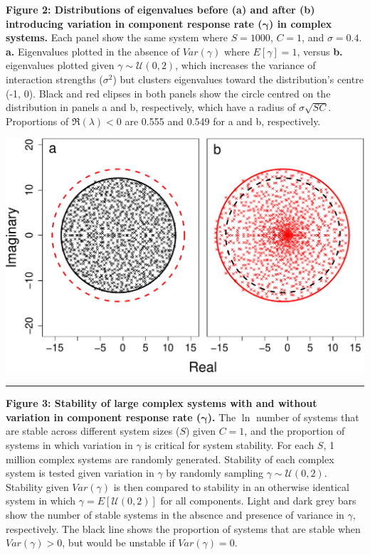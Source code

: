 \documentclass[]{article}
\begin{document}
\textbf{Figure 2: Distributions of eigenvalues before (a) and after (b)
introducing variation in component response rate
(\(\boldsymbol{\gamma}\)) in complex systems.} Each panel show the same
system where \(S = 1000\), \(C = 1\), and \(\sigma = 0.4\). \textbf{a.}
Eigenvalues plotted in the absence of \(Var(\gamma)\) where
\(E[\gamma] = 1\), versus \textbf{b.} eigenvalues plotted given
\(\gamma \sim \mathcal{U}(0, 2)\), which increases the variance of
interaction strengths (\(\sigma^{2}\)) but clusters eigenvalues toward
the distribution's centre (-1, 0). Black and red elipses in both panels
show the circle centred on the distribution in panels a and b,
respectively, which have a radius of \(\sigma \sqrt{SC}\). Proportions
of \(\Re(\lambda) < 0\) are 0.555 and 0.549 for a and b, respectively.

\includegraphics{ms_files/figure-latex/unnamed-chunk-8-1.pdf}

\begin{center}\rule{0.5\linewidth}{\linethickness}\end{center}

\textbf{Figure 3: Stability of large complex systems with and without
variation in component response rate (\(\boldsymbol{\gamma}\)).} The
\(\ln\) number of systems that are stable across different system sizes
(\(S\)) given \(C = 1\), and the proportion of systems in which
variation in \(\gamma\) is critical for system stability. For each
\(S\), 1 million complex systems are randomly generated. Stability of
each complex system is tested given variation in \(\gamma\) by randomly
sampling \(\gamma \sim \mathcal{U}(0, 2)\). Stability given
\(Var(\gamma)\) is then compared to stability in an otherwise identical
system in which \(\gamma = E[\mathcal{U}(0, 2)]\) for all components.
Light and dark grey bars show the number of stable systems in the
absence and presence of variance in \(\gamma\), respectively. The black
line shows the proportion of systems that are stable when
\(Var(\gamma) > 0\), but would be unstable if \(Var(\gamma) = 0\).
\end{document}
